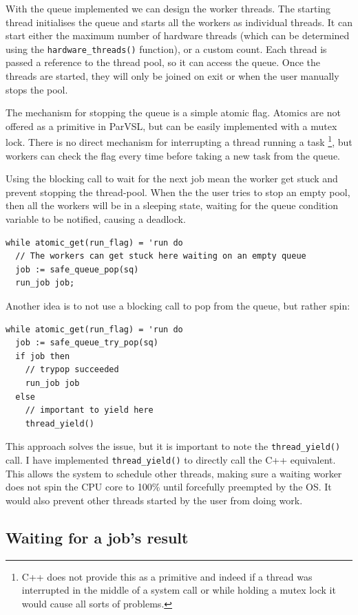 With the queue implemented we can design the worker threads. The starting thread
initialises the queue and starts all the workers as individual threads. It can start
either the maximum number of hardware threads (which can be determined using the
\texttt{hardware\_threads()} function), or a custom count. Each thread is passed a reference to
the thread pool, so it can access the queue. Once the threads are started, they will only
be joined on exit or when the user manually stops the pool.

The mechanism for stopping the queue is a simple atomic flag. Atomics are not offered as
a primitive in ParVSL, but can be easily implemented with a mutex lock. There is no direct
mechanism for interrupting a thread running a task \footnote{C++ does not provide this as a
primitive and indeed if a thread was interrupted in the middle of a system call or while
holding a mutex lock it would cause all sorts of problems.}, but workers can check the flag every time
before taking a new task from the queue.

Using the blocking call to wait for the next job mean the worker get stuck and prevent
stopping the thread-pool. When the the user tries to stop an empty pool, then all
the workers will be in a sleeping state, waiting for the queue condition variable to be
notified, causing a deadlock.

\begin{verbatim}
while atomic_get(run_flag) = 'run do
  // The workers can get stuck here waiting on an empty queue
  job := safe_queue_pop(sq)
  run_job job;
\end{verbatim}

Another idea is to not use a blocking call to pop from the queue, but rather spin:
\begin{verbatim}
while atomic_get(run_flag) = 'run do
  job := safe_queue_try_pop(sq)
  if job then
    // trypop succeeded
    run_job job
  else
    // important to yield here
    thread_yield()
\end{verbatim}

This approach solves the issue, but it is important to note the \texttt{thread\_yield()} call.
I have implemented \texttt{thread\_yield()} to directly call the C++ equivalent. This allows the
system to schedule other threads, making sure a waiting worker does not spin the CPU
core to 100\% until forcefully preempted by the OS. It would also prevent other threads
started by the user from doing work.

\subsection{Waiting for a job's result}
\label{ssec:waitjob}

